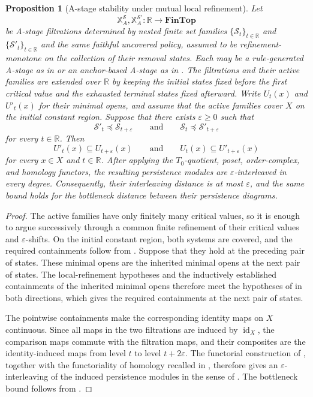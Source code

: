 \documentclass[a4paper,11pt]{article}
\newtheorem{proposition}[proposition]{Proposition}
\theoremstyle{definition}
\theoremstyle{remark}
\DeclareMathOperator{\id}{id}
\begin{document}
\begin{proposition}[A-stage stability under mutual local refinement]
\label{prop:rule-refinement-stability}
Let
$$
\mathbb X_{A}^{\mathcal S},\mathbb X_{A}^{\mathcal S'}\colon\mathbb R\longrightarrow\mathbf{FinTop}
$$
be A-stage filtrations determined by nested finite set families $\{\mathcal S_t\}_{t\in\mathbb R}$ and $\{\mathcal S'_t\}_{t\in\mathbb R}$ and the same faithful uncovered policy, assumed to be refinement-monotone on the collection of their removal states. Each may be a rule-generated A-stage as in  or an anchor-based A-stage as in . The filtrations and their active families are extended over $\mathbb R$ by keeping the initial states fixed before the first critical value and the exhausted terminal states fixed afterward. Write $U_t(x)$ and $U'_t(x)$ for their minimal opens, and assume that the active families cover $X$ on the initial constant region. Suppose that there exists $\varepsilon\geq0$ such that
$$
\mathcal S'_t\preccurlyeq\mathcal S_{t+\varepsilon}
\qquad\text{and}\qquad
\mathcal S_t\preccurlyeq\mathcal S'_{t+\varepsilon}
$$
for every $t\in\mathbb R$. Then
$$
U'_t(x)\subseteq U_{t+\varepsilon}(x)
\qquad\text{and}\qquad
U_t(x)\subseteq U'_{t+\varepsilon}(x)
$$
for every $x\in X$ and $t\in\mathbb R$. After applying the $T_0$-quotient, poset, order-complex, and homology functors, the resulting persistence modules are $\varepsilon$-interleaved in every degree. Consequently, their interleaving distance is at most $\varepsilon$, and the same bound holds for the bottleneck distance between their persistence diagrams.
\end{proposition}

\begin{proof}
The active families have only finitely many critical values, so it is enough to argue successively through a common finite refinement of their critical values and $\varepsilon$-shifts. On the initial constant region, both systems are covered, and the required containments follow from . Suppose that they hold at the preceding pair of states. These minimal opens are the inherited minimal opens at the next pair of states. The local-refinement hypotheses and the inductively established containments of the inherited minimal opens therefore meet the hypotheses of  in both directions, which gives the required containments at the next pair of states.

The pointwise containments make the corresponding identity maps on $X$ continuous. Since all maps in the two filtrations are induced by $\id_X$, the comparison maps commute with the filtration maps, and their composites are the identity-induced maps from level $t$ to level $t+2\varepsilon$. The functorial construction of , together with the functoriality of homology recalled in , therefore gives an $\varepsilon$-interleaving of the induced persistence modules in the sense of . The bottleneck bound follows from .
\end{proof}
\end{document}
